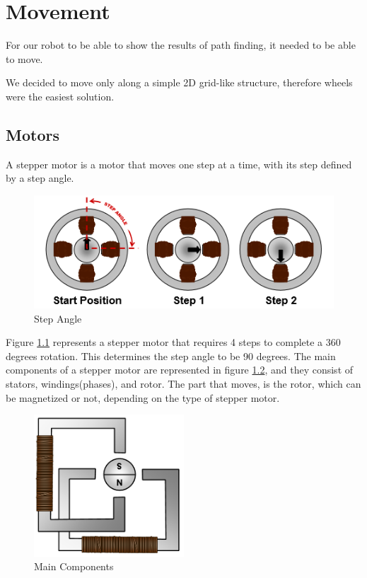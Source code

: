 \chapter{Movement}\label{ch:move}
For our robot to be able to show the results of path finding,
it needed to be able to move.

We decided to move only along a simple 2D grid-like structure,
therefore wheels were the easiest solution.

\section{Motors}\label{sec:motors}
A stepper motor is a motor that moves one step at a time, with its step defined by a step angle.

\begin{figure}[ht]
	\centering
	\includegraphics[width=\textwidth]{figures/move/motor1.png}
	\caption{Step Angle}
	\label{fig:angle} 
\end{figure}

Figure \ref{fig:angle} represents a stepper motor that requires 4 steps to complete a 360 degrees rotation. This determines the step angle to be 90 degrees.
The main components of a stepper motor are represented in figure \ref{fig:main_components}, and they consist of stators, windings(phases), and rotor.
The part that moves, is the rotor, which can be magnetized or not, depending on the type of stepper motor.

\begin{figure}[ht]
	\centering
	\includegraphics[width=0.5\textwidth]{figures/move/motor2.png}
	\caption{Main Components}
	\label{fig:main_components}
\end{figure}

